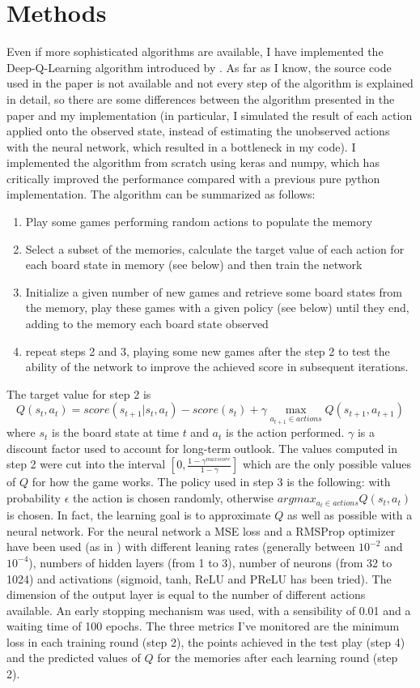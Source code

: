 \documentclass[]{article}
\begin{document}
\section{Methods}
Even if more sophisticated algorithms are available, I have implemented the Deep-Q-Learning algorithm introduced by \textcite{Mnih2015}.
As far as I know, the source code used in the paper is not available and not every step of the algorithm is explained in detail, so there are some differences between the algorithm presented in the paper and my implementation (in particular, I simulated the result of each action applied onto the observed state, instead of estimating the unobserved actions with the neural network, which resulted in a bottleneck in my code).
I implemented the algorithm from scratch using keras and numpy, which has critically improved the performance compared with a previous pure python implementation. 
The algorithm can be summarized as follows:
\begin{enumerate}
	\item Play some games performing random actions to populate the memory
	\item Select a subset of the memories, calculate the target value of each action for each board state in memory (see below) and then train the network
	\item Initialize a given number of new games and retrieve some board states from the memory, play these games with a given policy (see below) until they end, adding to the memory each board state observed
	\item repeat steps 2 and 3, playing some new games after the step 2 to test the ability of the network to improve the achieved score in subsequent iterations.
\end{enumerate}
The target value for step 2 is
$$Q(s_t, a_t) = score(s_{t+1} | s_t, a_t) - score(s_t) + \gamma \max_{a_{t+1} \in actions} Q(s_{t+1}, a_{t+1})$$
where $s_t$ is the board state at time $t$ and $a_t$ is the action performed. $\gamma$ is a discount factor used to account for long-term outlook. The values computed in step 2 were cut into the interval $[0,\frac{1-\gamma^{max score}}{1-\gamma}]$ which are the only possible values of $Q$ for how the game works.
The policy used in step 3 is the following: with probability $\epsilon$ the action is chosen randomly, otherwise $argmax_{a_t \in actions} Q(s_t, a_t)$ is chosen.
In fact, the learning goal is to approximate $Q$ as well as possible with a neural network.
For the neural network a MSE loss and a RMSProp optimizer have been used (as in \cite{Mnih2015}) with different leaning rates (generally between $10^{-2}$ and $10^{-4}$), numbers of hidden layers (from 1 to 3), number of neurons (from 32 to 1024) and activations (sigmoid, tanh, ReLU and PReLU has been tried). 
The dimension of the output layer is equal to the number of different actions available. An early stopping mechanism was used, with a sensibility of 0.01 and a waiting time of 100 epochs.
The three metrics I've monitored are the minimum loss in each training round (step 2), the points achieved in the test play (step 4) and the predicted values of $Q$ for the memories after each learning round (step 2).
\end{document}
